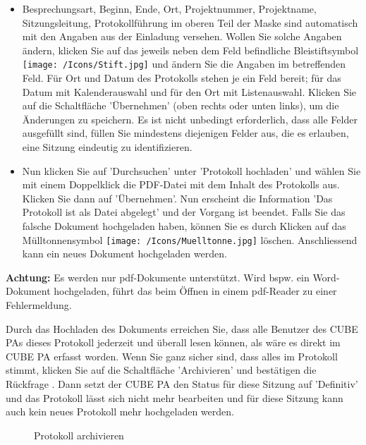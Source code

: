 \begin{itemize}
\item
Besprechungsart, Beginn, Ende, Ort, Projektnummer, Projektname, Sitzungsleitung, Protokollführung im oberen Teil der Maske sind automatisch mit den Angaben aus der Einladung versehen. Wollen Sie solche Angaben ändern, klicken Sie auf das jeweils neben dem Feld befindliche Bleistiftsymbol \texttt{[image: /Icons/Stift.jpg]}  und ändern Sie die Angaben im betreffenden Feld. Für Ort und Datum  des Protokolls stehen je ein Feld bereit; für das Datum mit Kalenderauswahl und für den Ort mit Listenauswahl. Klicken Sie auf die Schaltfläche 'Übernehmen' (oben rechts oder unten links), um die Änderungen zu speichern. Es ist nicht unbedingt erforderlich, dass alle Felder ausgefüllt sind, füllen Sie mindestens diejenigen Felder aus, die es erlauben, eine Sitzung eindeutig zu identifizieren.
\item
Nun klicken Sie auf 'Durchsuchen'  unter 'Protokoll hochladen' und wählen Sie mit einem Doppelklick die PDF-Datei mit dem Inhalt des Protokolls aus. Klicken Sie dann auf 'Übernehmen'. Nun erscheint die Information 'Das Protokoll ist als Datei abgelegt'  und der Vorgang ist beendet. Falls Sie das falsche Dokument hochgeladen haben, können Sie es durch Klicken auf das Mülltonnensymbol \texttt{[image: /Icons/Muelltonne.jpg]} löschen. Anschliessend kann ein neues Dokument hochgeladen werden.
\end{itemize}

\vspace{\baselineskip}

\textbf{Achtung:} Es werden nur pdf-Dokumente unterstützt. Wird bspw. ein Word-Dokument hochgeladen, führt das beim Öffnen in einem pdf-Reader zu einer Fehlermeldung.

\vspace{\baselineskip}

Durch das Hochladen des Dokuments erreichen Sie, dass alle Benutzer des CUBE PAs dieses Protokoll jederzeit und überall lesen können, als wäre es direkt im CUBE PA erfasst worden. Wenn Sie ganz sicher sind, dass alles im Protokoll stimmt, klicken Sie auf die Schaltfläche 'Archivieren'  und bestätigen die Rückfrage . Dann setzt der CUBE PA den Status für diese Sitzung auf 'Definitiv' und das Protokoll lässt sich nicht mehr bearbeiten und für diese Sitzung kann auch kein neues Protokoll mehr hochgeladen werden.

\begin{figure}[H]
\caption{Protokoll archivieren}
\end{figure}

